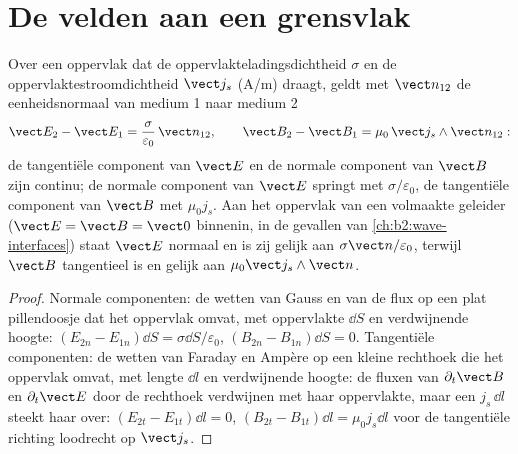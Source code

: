 \section{De velden aan een grensvlak}

\begin{proposition}[Overgangsrelaties]\label{prop:b2:maxwell-equations:boundary}
Over een oppervlak dat de oppervlakteladingsdichtheid $\sigma$ en de
oppervlaktestroomdichtheid $\vect j_s$ (\unit{A/m}) draagt, geldt met
$\vect n_{12}$ de eenheidsnormaal van medium 1 naar medium 2
\[
\vect E_2 - \vect E_1 = \frac\sigma{\varepsilon_0}\,\vect n_{12} , \qquad
\vect B_2 - \vect B_1 = \mu_0\,\vect j_s\wedge\vect n_{12} :
\]
de tangentiële component van $\vect E$ en de normale component van $\vect B$
zijn continu; de normale component van $\vect E$ springt met
$\sigma/\varepsilon_0$, de tangentiële component van $\vect B$ met
$\mu_0j_s$. Aan het oppervlak van een volmaakte geleider
($\vect E = \vect B = \vect 0$ binnenin, in de gevallen van
\cref{ch:b2:wave-interfaces}) staat $\vect E$ normaal en is zij gelijk aan
$\sigma\vect n/
\varepsilon_0$, terwijl $\vect B$ tangentieel is en gelijk
aan $\mu_0\vect j_s\wedge\vect n$.
\end{proposition}

\begin{proof}
Normale componenten: de wetten van Gauss en van de flux op een plat
pillendoosje dat het oppervlak omvat, met oppervlakte $\dd S$ en
verdwijnende hoogte: $(E_{2n}
- E_{1n})\dd S = \sigma\dd S/\varepsilon_0$,
$(B_{2n} - B_{1n})\dd S = 0$. Tangentiële componenten: de wetten van Faraday
en Ampère op een kleine rechthoek die het oppervlak omvat, met lengte
$\dd l$ en verdwijnende hoogte: de fluxen van $\partial_t\vect B$ en
$\partial_t\vect E$ door de rechthoek verdwijnen met haar oppervlakte, maar
een  $j_s\,\dd l$ steekt haar over:
$(E_{2t} - E_{1t})\dd l = 0$, $(B_{2t} - B_{1t})\dd l = \mu_0j_s\dd l$ voor
de tangentiële richting loodrecht op $\vect j_s$.
\end{proof}

